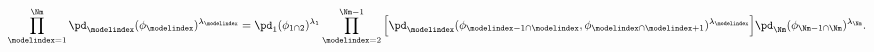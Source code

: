\begin{equation}
  \prod_{\modelindex = 1}^{\Nm}
    \pd_{\modelindex}(\phi_{\modelindex})^{\lambda_{\modelindex}}
  = 
  \pd_{1}(\phi_{1 \cap 2})^{\lambda_{1}}
  \prod_{\modelindex = 2}^{\Nm - 1}
  \Big[
    \pd_{\modelindex}(\phi_{\modelindex - 1 \cap \modelindex}, \phi_{\modelindex \cap \modelindex + 1})^{\lambda_{\modelindex}}
  \Big]
  \pd_{\Nm}(\phi_{\Nm - 1 \cap \Nm})^{\lambda_{\Nm}}.
  \label{eqn:pooled-prior-log-alt-def}
\end{equation}